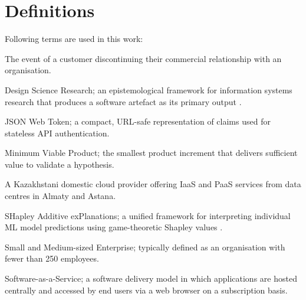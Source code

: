 \chapter{Definitions}

Following terms are used in this work:\par\bigskip

\begin{description}[style=multiline, labelwidth=5cm, leftmargin=5.5cm]

	\item[Churn]
	The event of a customer discontinuing their commercial
	relationship with an organisation.

	\item[DSR\\]
	Design Science Research; an epistemological framework for
	information systems research that produces a software artefact as
	its primary output \citep{hevner2004}.

	\item[JWT\\]
	JSON Web Token; a compact, URL-safe representation of claims used
	for stateless API authentication. 	

	\item[MVP\\]
	Minimum Viable Product; the smallest product increment that
	delivers sufficient value to validate a hypothesis.

	\item[QazCloud\\]
	A Kazakhstani domestic cloud provider offering IaaS and PaaS
	services from data centres in Almaty and Astana.

	\item[SHAP\\]
	SHapley Additive exPlanations; a unified framework for
	interpreting individual ML model predictions using game-theoretic
	Shapley values \citep{lundberg2017shap}. 

	\item[SME\\]
	Small and Medium-sized Enterprise; typically defined as an
	organisation with fewer than 250 employees.

	\item[SaaS\\]
	Software-as-a-Service; a software delivery model in which
	applications are hosted centrally and accessed by end users via a web
	browser on a subscription basis.


  

\end{description}

